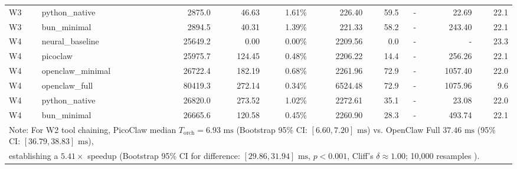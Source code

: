 \begin{table}[t]
\begin{tabular}{llrrrrrrrr}
W3 & python\_native & 2875.0 & 46.63 & 1.61\% & 226.40 & 59.5 & - & 22.69 & 22.1 \\
W3 & bun\_minimal & 2894.5 & 40.31 & 1.39\% & 221.33 & 58.2 & - & 243.40 & 22.1 \\
\midrule
W4 & neural\_baseline & 25649.2 & 0.00 & 0.00\% & 2209.56 & 0.0 & - & - & 23.3 \\
W4 & picoclaw & 25975.7 & 124.45 & 0.48\% & 2206.22 & 14.4 & - & 256.26 & 22.1 \\
W4 & openclaw\_minimal & 26722.4 & 182.19 & 0.68\% & 2261.96 & 72.9 & - & 1057.40 & 22.0 \\
W4 & openclaw\_full & 80419.3 & 272.14 & 0.34\% & 6524.48 & 72.9 & - & 1075.96 & 9.6 \\
W4 & python\_native & 26820.0 & 273.52 & 1.02\% & 2272.61 & 35.1 & - & 23.08 & 22.0 \\
W4 & bun\_minimal & 26665.6 & 120.58 & 0.45\% & 2260.90 & 28.3 & - & 493.74 & 22.1 \\
\midrule
\multicolumn{10}{l}{\footnotesize Note: For W2 tool chaining, PicoClaw median $T_{\text{orch}} = 6.93\text{ ms}$ (Bootstrap 95\% CI: $[6.60, 7.20]\text{ ms}$) vs. OpenClaw Full $37.46\text{ ms}$ (95\% CI: $[36.79, 38.83]\text{ ms}$),} \\
\multicolumn{10}{l}{\footnotesize establishing a $5.41\times$ speedup (Bootstrap 95\% CI for difference: $[29.86, 31.94]\text{ ms}$, $p < 0.001$, Cliff's $\delta \approx 1.00$; 10,000 resamples \cite{efron1979}).} \\
\bottomrule
\end{tabular}
\end{table}
